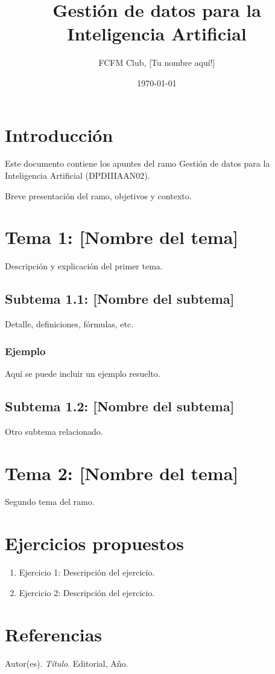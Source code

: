 \documentclass[12pt]{article}
\title{Gestión de datos para la Inteligencia Artificial}
\author{FCFM Club, [Tu nombre aquí!]}
\date{\today}
\begin{document}
\maketitle
\tableofcontents
\newpage

\section{Introducción}
Este documento contiene los apuntes del ramo Gestión de datos para la Inteligencia Artificial (DPDIIIAAN02).

Breve presentación del ramo, objetivos y contexto.

\section{Tema 1: [Nombre del tema]}
Descripción y explicación del primer tema.

\subsection{Subtema 1.1: [Nombre del subtema]}
Detalle, definiciones, fórmulas, etc.

\subsubsection{Ejemplo}
Aquí se puede incluir un ejemplo resuelto.

\subsection{Subtema 1.2: [Nombre del subtema]}
Otro subtema relacionado.

\section{Tema 2: [Nombre del tema]}
Segundo tema del ramo.


\section{Ejercicios propuestos}
\begin{enumerate}
    \item Ejercicio 1: Descripción del ejercicio.
    \item Ejercicio 2: Descripción del ejercicio.
\end{enumerate}

\section{Referencias}
\begin{thebibliography}{9}
     Autor(es). \textit{Título}. Editorial, Año.
\end{thebibliography}
\end{document}
